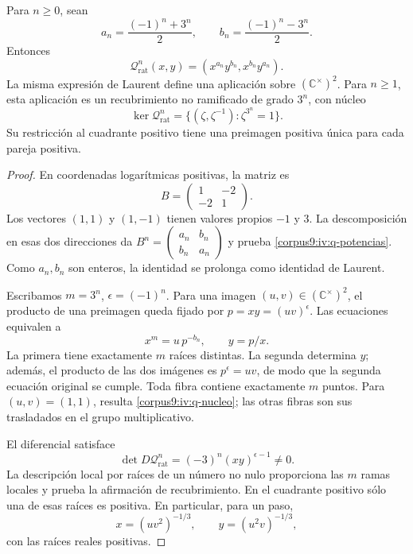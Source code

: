 \begin{proposition}
\label{corpus9:iv:q-iteracion}
Para \(n\geq0\), sean
\[
 a_n=\frac{(-1)^n+3^n}{2},\qquad
 b_n=\frac{(-1)^n-3^n}{2}.
\]
Entonces
\begin{equation}
 \mathcal Q_{\mathrm{rat}}^n(x,y)
   =(x^{a_n}y^{b_n},x^{b_n}y^{a_n}).
 \label{corpus9:iv:q-potencias}
\end{equation}
La misma expresión de Laurent define una aplicación sobre
\((\mathbb C^\times)^2\). Para \(n\geq1\), esta aplicación es un
recubrimiento no ramificado de grado \(3^n\), con núcleo
\begin{equation}
 \ker\mathcal Q_{\mathrm{rat}}^n
   =\{(\zeta,\zeta^{-1}):\zeta^{3^n}=1\}.
 \label{corpus9:iv:q-nucleo}
\end{equation}
Su restricción al cuadrante positivo tiene una preimagen positiva
única para cada pareja positiva.
\end{proposition}
\begin{proof}
En coordenadas logarítmicas positivas, la matriz es
\[
 B=\begin{pmatrix}1&-2\\-2&1\end{pmatrix}.
\]
Los vectores \((1,1)\) y \((1,-1)\) tienen valores propios
\(-1\) y \(3\). La descomposición en esas dos direcciones da
\(B^n=\left(\begin{smallmatrix}a_n&b_n\\b_n&a_n\end{smallmatrix}\right)\)
y prueba \eqref{corpus9:iv:q-potencias}. Como \(a_n,b_n\) son
enteros, la identidad se prolonga como identidad de Laurent.

Escribamos \(m=3^n\), \(\epsilon=(-1)^n\). Para una imagen
\((u,v)\in(\mathbb C^\times)^2\), el producto de una preimagen
queda fijado por \(p=xy=(uv)^\epsilon\). Las ecuaciones equivalen a
\[
 x^m=u\,p^{-b_n},\qquad y=p/x.
\]
La primera tiene exactamente \(m\) raíces distintas. La segunda
determina \(y\); además, el producto de las dos imágenes es
\(p^\epsilon=uv\), de modo que la segunda ecuación original se
cumple. Toda fibra contiene exactamente \(m\) puntos. Para
\((u,v)=(1,1)\), resulta \eqref{corpus9:iv:q-nucleo}; las otras
fibras son sus trasladados en el grupo multiplicativo.

El diferencial satisface
\[
 \det D\mathcal Q_{\mathrm{rat}}^n
   =(-3)^n(xy)^{\epsilon-1}\ne0.
\]
La descripción local por raíces de un número no nulo proporciona
las \(m\) ramas locales y prueba la afirmación de recubrimiento.
En el cuadrante positivo sólo una de esas raíces es positiva.
En particular, para un paso,
\[
 x=(uv^2)^{-1/3},\qquad y=(u^2v)^{-1/3},
\]
con las raíces reales positivas.
\end{proof}

